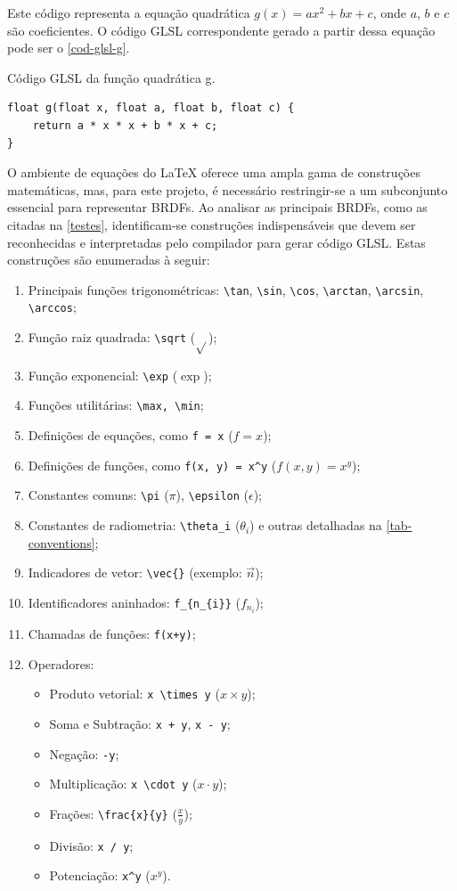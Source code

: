 Este código representa a equação quadrática \( g(x) = ax^2 + bx + c \), onde \( a \), \( b \) e \( c \) são coeficientes. O código GLSL correspondente gerado a partir dessa equação pode ser o \autoref{cod-glsl-g}.

\begin{codigo}[H]
\caption{\small Código GLSL da função quadrática g.}
\label{cod-glsl-g}
\begin{lstlisting}
float g(float x, float a, float b, float c) {
    return a * x * x + b * x + c;
}
\end{lstlisting}
\end{codigo}

O ambiente de equações do \LaTeX{} oferece uma ampla gama de construções matemáticas, mas, para este projeto, é necessário restringir-se a um subconjunto essencial para representar BRDFs. Ao analisar as principais BRDFs, como as citadas na \autoref{testes}, identificam-se construções indispensáveis que devem ser reconhecidas e interpretadas pelo compilador para gerar código GLSL. Estas construções são enumeradas à seguir:

\begin{enumerate}
\item Principais funções trigonométricas: \verb"\tan", \verb"\sin", \verb"\cos", \verb"\arctan", \verb"\arcsin", \verb"\arccos";
\item Função raiz quadrada: \verb"\sqrt" ($\sqrt{}$);
\item Função exponencial: \verb"\exp" ($\exp{}$);
\item Funções utilitárias: \verb"\max, \min";
\item Definições de equações, como \verb"f = x" ($f = x$);
\item Definições de funções, como \verb"f(x, y) = x^y" ($f(x, y) = x^y$);
\item Constantes comuns: \verb"\pi" ($\pi$), \verb"\epsilon" ($\epsilon$);
\item Constantes de radiometria: \verb"\theta_i" ($\theta_i$) e outras detalhadas na \autoref{tab-conventions};
\item Indicadores de vetor: \verb"\vec{}" (exemplo: $\vec{n}$);
\item Identificadores aninhados: \verb"f_{n_{i}}" ($f_{n_{i}}$);
\item Chamadas de funções: \verb"f(x+y)";
\item Operadores:
\begin{itemize}
\item Produto vetorial: \verb"x \times y" ($x \times y$);
\item Soma e Subtração: \verb"x + y", \verb"x - y";
\item Negação: \verb"-y";
\item Multiplicação: \verb"x \cdot y" ($x \cdot y$);
\item Frações: \verb"\frac{x}{y}" ($\frac{x}{y}$);
\item Divisão: \verb"x / y";
\item Potenciação: \verb"x^y" ($x^y$).
\end{itemize}
\end{enumerate}

